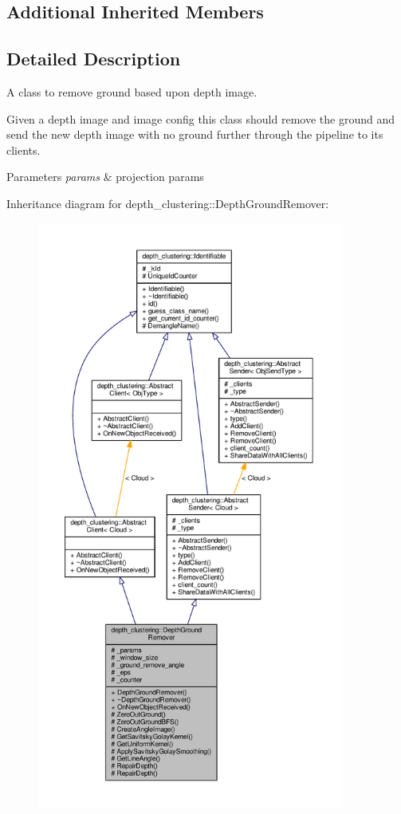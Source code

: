\subsection*{Additional Inherited Members}


\subsection{Detailed Description}
A class to remove ground based upon depth image. 

Given a depth image and image config this class should remove the ground and send the new depth image with no ground further through the pipeline to its clients.


\begin{DoxyParams}{Parameters}
{\em params} & projection params \\
\hline
\end{DoxyParams}


Inheritance diagram for depth\+\_\+clustering\+:\+:Depth\+Ground\+Remover\+:\nopagebreak
\begin{figure}[H]
\begin{center}
\leavevmode
\includegraphics[height=550pt]{classdepth__clustering_1_1DepthGroundRemover__inherit__graph}
\end{center}
\end{figure}


